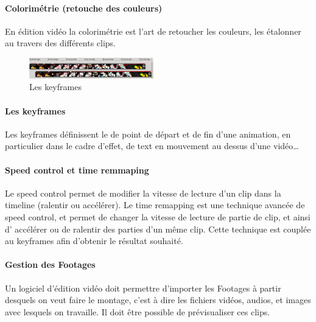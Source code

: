 \paragraph{Colorimétrie (retouche des couleurs)}

En édition vidéo la colorimétrie est l'art de retoucher les couleurs,
les étalonner au travers des différents clips.

\begin{figure}
   \vspace{-20pt}
    \begin{center}
      \includegraphics[width=0.48\textwidth]{images/keyframecurves}
    \end{center}
   \vspace{-30pt}
   \caption{Les keyframes}
   \vspace{-10pt}
   \label{Yes}
\end{figure}

\paragraph{Les keyframes}

Les keyframes définissent le de point de départ et de fin d'une animation,
en particulier dans le cadre d'effet, de text en mouvement au dessus
d'une vidéo\ldots

\paragraph{Speed control et time remmaping}

Le speed control permet de modifier la vitesse de lecture d'un clip dans la
timeline (ralentir ou accélérer). Le time remapping est une technique avancée
de speed control, et permet de changer la vitesse de lecture de partie de clip,
et ainsi d' accélérer ou de ralentir des parties d'un même clip. Cette technique est
couplée au keyframes afin d'obtenir le résultat souhaité.

\paragraph{Gestion des Footages}

Un logiciel d'édition vidéo doit permettre d'importer les Footages  à partir
desquels on veut faire le montage, c'est à dire les fichiers vidéos, audios,
et images avec lesquels on travaille. Il doit être possible de prévisualiser ces
clips.

